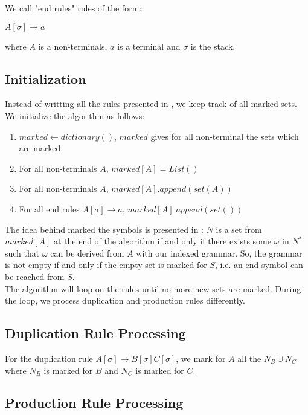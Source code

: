 \begin{Definition}
We call "end rules" rules of the form:

$A[\sigma] \rightarrow a$

where $A$ is a non-terminals, $a$ is a terminal and $\sigma$ is the stack.
\end{Definition}

\subsection{Initialization}
\label{initAlgo}

Instead of writting all the rules presented in \cite{aho68}, we keep track of all marked sets. We initialize the algorithm as follows:

\begin{enumerate}
\item $marked \leftarrow dictionary()$, $marked$ gives for all non-terminal the sets which are marked.
\item For all non-terminals $A$, $marked[A] = List()$
\item For all non-terminals $A$, $marked[A].append(set(A))$
\item For all end rules $A[\sigma] \rightarrow a$, $marked[A].append(set())$ 
\end{enumerate}

The idea behind marked the symbols is presented in \cite{aho68}: $N$ is a set from $marked[A]$ at the end of the algorithm if and only if there exists some $\omega$ in $N^*$ such that $\omega$ can be derived from $A$ with our indexed grammar. So, the grammar is not empty if and only if the empty set is marked for $S$, i.e. an end symbol can be reached from $S$.\\

The algorithm will loop on the rules until no more new sets are marked. During the loop, we process duplication and production rules differently.

\subsection{Duplication Rule Processing}
\label{processDuplication}

For the duplication rule $A[\sigma] \rightarrow B[\sigma] C[\sigma]$, we mark for $A$ all the $N_B \cup N_C$ where $N_B$ is marked for $B$ and $N_C$ is marked for $C$.

\subsection{Production Rule Processing}
\label{processProduction}

